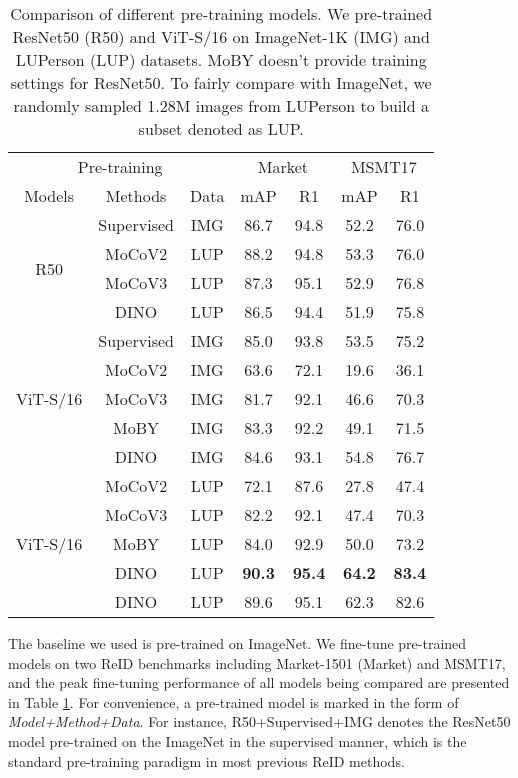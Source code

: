 \documentclass[10pt,twocolumn,letterpaper]{article}
\begin{document}
\renewcommand{\multirowsetup}{\centering}
\begin{table}[tb]\small
    \begin{center}
    \setlength\tabcolsep{5pt}
    \begin{tabular}{ccc|cc|cc}
    \hline
     \multicolumn{3}{c|}{Pre-training}  & \multicolumn{2}{c|}{Market}  & \multicolumn{2}{c}{MSMT17}\\
    Models & Methods &Data & mAP & R1 & mAP & R1\\
    \hline
    \multirow{4}{*}{R50}& Supervised &IMG &86.7 &94.8 &52.2 &76.0\\
    & MoCoV2 &LUP &88.2 &94.8 &53.3 &76.0\\
    & MoCoV3 &LUP &87.3 &95.1 &52.9 &76.8\\
    & DINO &LUP &86.5 &94.4 &51.9 &75.8\\
    \hline
    \multirow{5}{*}{ViT-S/16}& Supervised &IMG &85.0 &93.8 &53.5 &75.2\\
    &MoCoV2 &IMG &63.6 &72.1 &19.6 &36.1\\
    &MoCoV3 &IMG &81.7 &92.1 &46.6 &70.3\\
    &MoBY &IMG &83.3 &92.2 &49.1 &71.5\\
    &DINO &IMG &84.6 &93.1 &54.8 &76.7\\
    \hline
    \multirow{6}{*}{ViT-S/16}&MoCoV2 &LUP &72.1 &87.6 &27.8 &47.4\\
    &MoCoV3 &LUP &82.2 &92.1 &47.4 &70.3\\
    &MoBY &LUP &84.0 &92.9 &50.0 &73.2\\
    &DINO &LUP &\textbf{90.3} &\textbf{95.4} &\textbf{64.2} &\textbf{83.4}\\
    &DINO &LUP &89.6 &95.1 &62.3 &82.6\\
    \hline
    \end{tabular}
    \end{center}
    \vspace{-1em}
    \caption{\label{tab:ssl}Comparison of different pre-training models. We pre-trained ResNet50 (R50) and ViT-S/16 on ImageNet-1K (IMG) and LUPerson (LUP) datasets. MoBY doesn't provide training settings for ResNet50. To fairly compare with ImageNet, we randomly sampled 1.28M images from LUPerson to build a subset denoted as LUP.}
    \vspace{-1em}
\end{table}
The baseline \cite{he2021transreid} we used is pre-trained on ImageNet. We fine-tune pre-trained models on two ReID benchmarks including Market-1501 (Market) and MSMT17, and the peak fine-tuning performance of all models being compared are presented in Table \ref{tab:ssl}. For convenience, a pre-trained model is marked in the form of \textit{Model+Method+Data}. For instance, R50+Supervised+IMG denotes the ResNet50 model pre-trained on the ImageNet in the supervised manner, which is the standard pre-training paradigm in most previous ReID methods. 
\end{document}
